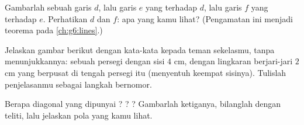 \begin{exercise}[$\star\star$]\label{exo:g4:geometry:9}
Gambarlah sebuah garis $d$, lalu garis $e$ yang  terhadap
$d$, lalu garis $f$ yang  terhadap $e$. Perhatikan $d$
dan $f$: apa yang kamu lihat? (Pengamatan ini menjadi teorema pada
\cref{ch:g6:lines}.)
\end{exercise}

\begin{exercise}[$\star\star$]\label{exo:g4:geometry:10}
Jelaskan gambar berikut dengan kata-kata kepada teman sekelasmu,
tanpa menunjukkannya: sebuah persegi dengan sisi $4$ cm, dengan
lingkaran berjari-jari $2$ cm yang berpusat di tengah persegi itu
(menyentuh keempat sisinya). Tulislah penjelasanmu sebagai langkah bernomor.
\end{exercise}

\begin{exercise}[$\star\star$]\label{exo:g4:geometry:11}
Berapa diagonal yang dipunyai ? ? ?
Gambarlah ketiganya, bilanglah dengan teliti, lalu jelaskan pola
yang kamu lihat.

\end{exercise}
